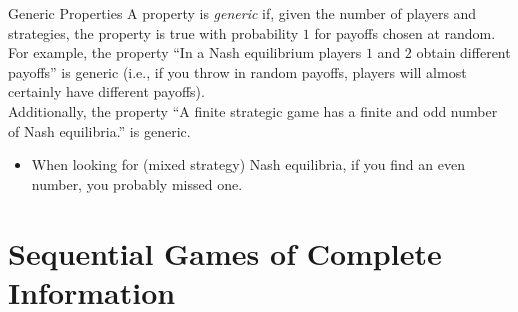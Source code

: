 \documentclass[10pt]{extarticle}
\begin{document}
  \begin{problem}{Generic Properties}
    A property is \textit{generic} if, given the number of players and strategies, the property is true with probability $1$ for payoffs chosen at random.\\

    For example, the property ``In a Nash equilibrium players $1$ and $2$ obtain different payoffs'' is generic (i.e., if you throw in random payoffs, players will almost certainly have different payoffs).\\

    Additionally, the property ``A finite strategic game has a finite and odd number of Nash equilibria.'' is generic.
    \begin{itemize}
      \item When looking for (mixed strategy) Nash equilibria, if you find an even number, you probably missed one.
    \end{itemize}
  \end{problem}
  \section*{Sequential Games of Complete Information}%
  
\end{document}
